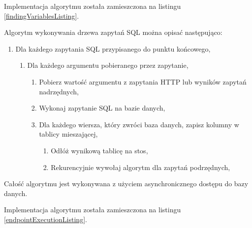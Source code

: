 Implementacja algorytmu została zamieszczona na listingu
\ref{findingVariablesListing}.



Algorytm wykonywania drzewa zapytań SQL można opisać następująco:

\begin{enumerate}

    \item Dla każdego zapytania SQL przypisanego do punktu końcowego,

        \begin{enumerate}

            \item Dla każdego argumentu pobieranego przez zapytanie,

                \begin{enumerate}

                    \item Pobierz wartość argumentu z zapytania HTTP lub wyników
                        zapytań nadrzędnych,

                    \item Wykonaj zapytanie SQL na bazie danych,

                    \item Dla każdego wiersza, który zwróci baza danych, zapisz
                        kolumny w tablicy mieszającej,

                        \begin{enumerate}

                            \item Odłóż wynikową tablicę na stos,

                            \item Rekurencyjnie wywołaj algorytm dla zapytań
                                podrzędnych,

                        \end{enumerate}

                \end{enumerate}

        \end{enumerate}

\end{enumerate}

Całość algorytmu jest wykonywana z użyciem asynchronicznego dostępu do bazy
danych.

Implementacja algorytmu została zamieszczona na listingu
\ref{endpointExecutionListing}.


